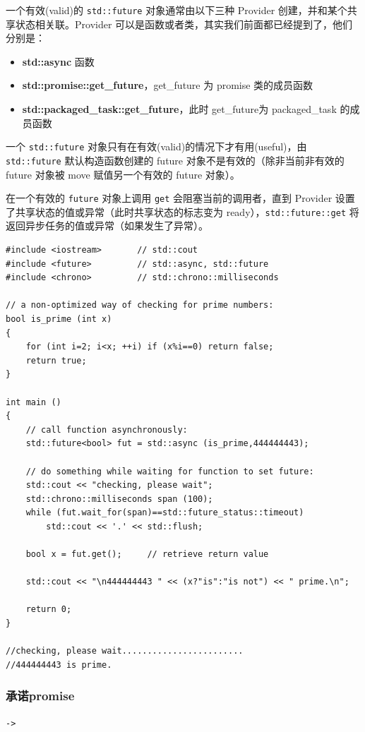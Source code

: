 \documentclass[UTF8,a4paper,12pt]{ctexbook}
\begin{document}
			一个有效(valid)的 \verb|std::future| 对象通常由以下三种 Provider 创建，并和某个共享状态相关联。Provider 可以是函数或者类，其实我们前面都已经提到了，他们分别是：
				\begin{itemize}
					\item \textbf{std::async} 函数
					\item \textbf{std::promise::get\_future}，get\_future 为 promise 类的成员函数
					\item \textbf{std::packaged\_task::get\_future}，此时 get\_future为 packaged\_task 的成员函数
				\end{itemize}

			一个 \verb|std::future| 对象只有在有效(valid)的情况下才有用(useful)，由 \verb|std::future| 默认构造函数创建的 future 对象不是有效的（除非当前非有效的 future 对象被 move 赋值另一个有效的 future 对象）。
			
			在一个有效的 \verb|future| 对象上调用 \verb|get| 会阻塞当前的调用者，直到 Provider 设置了共享状态的值或异常（此时共享状态的标志变为 ready），\verb|std::future::get| 将返回异步任务的值或异常（如果发生了异常）。
\begin{lstlisting}
#include <iostream>       // std::cout
#include <future>         // std::async, std::future
#include <chrono>         // std::chrono::milliseconds

// a non-optimized way of checking for prime numbers:
bool is_prime (int x) 
{
	for (int i=2; i<x; ++i) if (x%i==0) return false;
	return true;
}

int main ()
{
	// call function asynchronously:
	std::future<bool> fut = std::async (is_prime,444444443); 
	
	// do something while waiting for function to set future:
	std::cout << "checking, please wait";
	std::chrono::milliseconds span (100);
	while (fut.wait_for(span)==std::future_status::timeout)
		std::cout << '.' << std::flush;
	
	bool x = fut.get();     // retrieve return value
	
	std::cout << "\n444444443 " << (x?"is":"is not") << " prime.\n";
	
	return 0;
}

//checking, please wait........................
//444444443 is prime.
\end{lstlisting}			
	
		\subsubsection{承诺promise}\verb|->|
				
\end{document}
